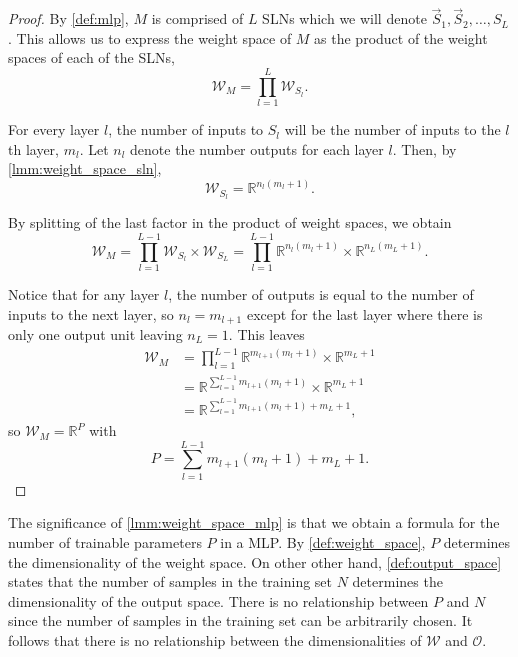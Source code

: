 \begin{proof}
    By \ref{def:mlp}, $M$ is comprised of $L$ SLNs which we will denote $\vec{S}_1, \vec{S}_2, \dots, S_L$.
    This allows us to express the weight space of $M$ as the product of the weight spaces of each of the SLNs,
    $$
        \mathcal{W}_M
        = \prod_{l=1}^L{\mathcal{W}_{S_l}}.
    $$

    For every layer $l$, the number of inputs to $S_l$ will be the number of inputs to the $l$th layer, $m_l$. 
    Let $n_l$ denote the number outputs for each layer $l$.
    Then, by \ref{lmm:weight_space_sln},
    $$\mathcal{W}_{S_l} = \mathbb{R}^{n_l(m_l+1)}.$$
    
    By splitting of the last factor in the product of weight spaces, we obtain 
    \begin{equation*}
        \mathcal{W}_M
        = \prod_{l=1}^{L-1}{\mathcal{W}_{S_l}} \times \mathcal{W}_{S_L}
        = \prod_{l=1}^{L-1}{\mathbb{R}^{n_l(m_l+1)}} \times \mathbb{R}^{n_L(m_L+1)}.
    \end{equation*}

    Notice that for any layer $l$, the number of outputs is equal to the number of inputs to the next layer, so $n_l=m_{l+1}$ except for the last layer where there is only one output unit leaving $n_L=1$.
    This leaves
    \begin{align*}
        \mathcal{W}_M
        &= \prod_{l=1}^{L-1}{\mathbb{R}^{m_{l+1}(m_l+1)}} \times \mathbb{R}^{m_L+1} \\
        &= \mathbb{R}^{\sum_{l=1}^{L-1}{m_{l+1}(m_l+1)}} \times \mathbb{R}^{m_L+1} \\
        &= \mathbb{R}^{\sum_{l=1}^{L-1}{m_{l+1}(m_l+1)} + m_L+1},
    \end{align*}
    so $\mathcal{W}_M = \mathbb{R}^P$ with
    \begin{equation*}
        P = \sum_{l=1}^{L-1}{m_{l+1}(m_l+1)} + m_L+1.
    \end{equation*}
\end{proof}

\begin{remark}
    The significance of \ref{lmm:weight_space_mlp} is that we obtain a formula for the number of trainable parameters $P$ in a MLP. 
    By \ref{def:weight_space}, $P$ determines the dimensionality of the weight space. 
    On other other hand, \ref{def:output_space} states that the number of samples in the training set $N$ determines the dimensionality of the output space.
    There is no relationship between $P$ and $N$ since the number of samples in the training set can be arbitrarily chosen. 
    It follows that there is no relationship between the dimensionalities of $\mathcal{W}$ and $\mathcal{O}$.
\end{remark}

